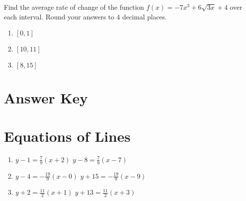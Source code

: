 Find the average rate of change of the function $f(x) = -7x^3 + 6\sqrt{3x} + 4$ over each interval. Round your answers to 4 decimal places.
\begin{enumerate}	\setcounter{enumi}{\value{Review}}
	\item $[0,1]$
	\item $[10,11]$
	\item $[8,15]$
\end{enumerate}	\setcounter{Review}{\value{enumi}}

\newpage

\section{Answer Key}

\section*{Equations of Lines}
\begin{enumerate}
\item $y-1 = \frac{7}{9}(x+2)$  $y-8=\frac{7}{9}(x-7)$
    \item $y-4 = -\frac{19}{9}(x-0)$  $y+15=-\frac{19}{9}(x-9)$
    \item $y+2 = \frac{11}{2}(x+1)$  $y+13=\frac{11}{2}(x+3)$
\end{enumerate}


